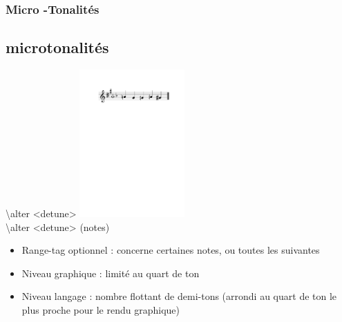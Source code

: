 \documentclass[12pt]{beamer}
\newenvironment{code}
  {\fontfamily{prc}\selectfont}{}
\begin{document}
    \begin{frame}
    \frametitle{Micro -Tonalités}
    \subsection{microtonalités}

    \begin{code} \textbackslash{}alter \textless{}detune\textgreater{} \end{code} \hspace{3cm} \includegraphics[width=4cm]{img/partitions/freekey.pdf} \\
    \begin{code} \textbackslash{}alter \textless{}detune\textgreater{} (notes) \end{code}
    
    
    \vspace{5mm}
    
    \begin{itemize}
      \item Range-tag optionnel : concerne certaines notes, ou toutes les suivantes
      \item Niveau graphique : limité au quart de ton
      \item Niveau langage : nombre flottant de demi-tons (arrondi au quart de ton le plus proche pour le rendu graphique)
    \end{itemize}
    
    \end{frame}
    
\end{document}
